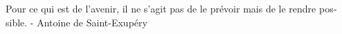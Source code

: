 \begin{center}
\vspace*{\fill}
{\selectfont \foreignlanguage{french} { Pour ce qui est de l'avenir, il ne s'agit pas de le prévoir mais de le rendre possible. }}
-
{\selectfont \foreignlanguage{french} { Antoine de Saint-Exupéry }}
\vspace*{\fill}
\end{center}










